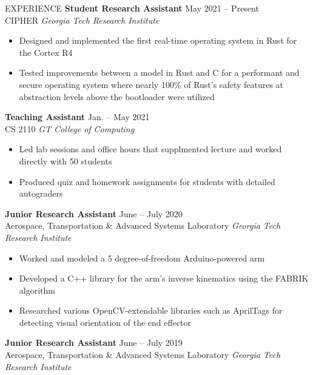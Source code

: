 \documentclass{resume} %
\begin{document}
\vspace{-0.8em}
\begin{rSection}{EXPERIENCE}
\textbf{Student Research Assistant} \hfill May 2021 -- Present\\
CIPHER \hfill \textit{Georgia Tech Research Institute}
\vspace{-0.5em}
 \begin{itemize}
    \itemsep -5pt {} 
     \item Designed and implemented the first real-time operating system in Rust for the Cortex R4
     \item Tested improvements between a model in Rust and C for a performant and secure operating system where
     nearly 100\% of Rust's safety features at abstraction levels above the bootloader were utilized
 \end{itemize}
\vspace{-0.5em}
\textbf{Teaching Assistant} \hfill Jan. -- May 2021\\
CS 2110 \hfill \textit{GT College of Computing}
\vspace{-0.5em}
 \begin{itemize}
    \itemsep -5pt {}
     \item Led lab sessions and office hours that supplmented lecture and worked directly with 50 students
     \item Produced quiz and homework assignments for students with detailed autograders
 \end{itemize}
\vspace{-0.5em}
\textbf{Junior Research Assistant} \hfill June -- July 2020\\
Aerospace, Transportation \& Advanced Systems Laboratory \hfill \textit{Georgia Tech Research Institute}
\vspace{-0.5em}
 \begin{itemize}
    \itemsep -5pt {} 
     \item Worked and modeled a 5 degree-of-freedom Arduino-powered arm
     \item Developed a C++ library for the arm's inverse kinematics using the FABRIK algorithm
     \item Researched various OpenCV-extendable libraries such as AprilTags for detecting visual orientation of the end effector
 \end{itemize}
 \vspace{-0.5em}
\textbf{Junior Research Assistant} \hfill June -- July 2019\\
Aerospace, Transportation \& Advanced Systems Laboratory \hfill \textit{Georgia Tech Research Institute}

\end{rSection}
\end{document}
